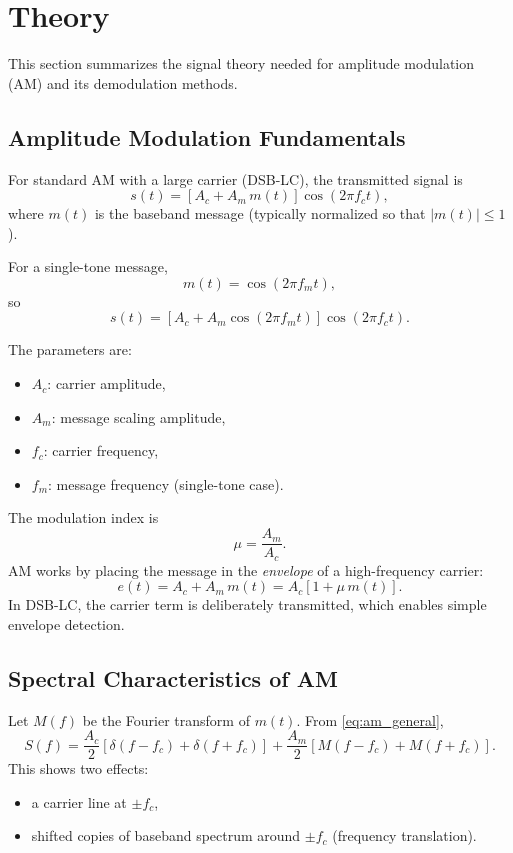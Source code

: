\section{Theory}
\label{sec:theory}
This section summarizes the signal theory needed for amplitude modulation (AM) and its demodulation methods.

\subsection{Amplitude Modulation Fundamentals}
For standard AM with a large carrier (DSB-LC), the transmitted signal is
\begin{equation}
s(t)=\left[A_c + A_m\,m(t)\right]\cos(2\pi f_c t),
\label{eq:am_general}
\end{equation}
where $m(t)$ is the baseband message (typically normalized so that $|m(t)|\le 1$).

For a single-tone message,
\begin{equation}
m(t)=\cos(2\pi f_m t),
\label{eq:single_tone}
\end{equation}
so
\begin{equation}
s(t)=\left[A_c + A_m\cos(2\pi f_m t)\right]\cos(2\pi f_c t).
\label{eq:am_single_tone}
\end{equation}

The parameters are:
\begin{itemize}
\item $A_c$: carrier amplitude,
\item $A_m$: message scaling amplitude,
\item $f_c$: carrier frequency,
\item $f_m$: message frequency (single-tone case).
\end{itemize}

The modulation index is
\begin{equation}
\mu=\frac{A_m}{A_c}.
\label{eq:mu_def}
\end{equation}
AM works by placing the message in the \emph{envelope} of a high-frequency carrier:
\begin{equation}
e(t)=A_c + A_m\,m(t)=A_c\left[1+\mu\,m(t)\right].
\end{equation}
In DSB-LC, the carrier term is deliberately transmitted, which enables simple envelope detection.

\subsection{Spectral Characteristics of AM}
Let $M(f)$ be the Fourier transform of $m(t)$. From \eqref{eq:am_general},
\begin{equation}
S(f)=\frac{A_c}{2}\!\left[\delta(f-f_c)+\delta(f+f_c)\right]
+\frac{A_m}{2}\!\left[M(f-f_c)+M(f+f_c)\right].
\label{eq:am_spectrum_general}
\end{equation}
This shows two effects:
\begin{itemize}
\item a carrier line at $\pm f_c$,
\item shifted copies of baseband spectrum around $\pm f_c$ (frequency translation).
\end{itemize}

